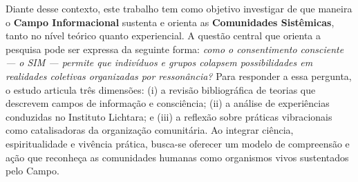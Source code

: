 Diante desse contexto, este trabalho tem como objetivo investigar de que maneira o \textbf{Campo Informacional} sustenta e orienta as \textbf{Comunidades Sistêmicas}, tanto no nível teórico quanto experiencial. A questão central que orienta a pesquisa pode ser expressa da seguinte forma: \textit{como o consentimento consciente — o SIM — permite que indivíduos e grupos colapsem possibilidades em realidades coletivas organizadas por ressonância?} Para responder a essa pergunta, o estudo articula três dimensões: (i) a revisão bibliográfica de teorias que descrevem campos de informação e consciência; (ii) a análise de experiências conduzidas no Instituto Lichtara; e (iii) a reflexão sobre práticas vibracionais como catalisadoras da organização comunitária. Ao integrar ciência, espiritualidade e vivência prática, busca-se oferecer um modelo de compreensão e ação que reconheça as comunidades humanas como organismos vivos sustentados pelo Campo.

\newpage